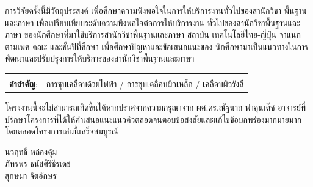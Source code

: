 \documentclass[12pt,oneside,openright,a4paper]{cpe-thai-project}
\begin{document}
การวิจัยครั้งนี้มีวัตถุประสงค์  เพื่อศึกษาความพึงพอใจในการให้บริการงานทั่วไปของสานักวิชา พื้นฐานและภาษา เพื่อเปรียบเทียบระดับความพึงพอใจต่อการให้บริการงาน ทั่วไปของสานักวิชาพื้นฐานและภาษา ของนักศึกษาที่มาใช้บริการสานักวิชาพื้นฐานและภาษา สถาบัน เทคโนโลยีไทย-ญี่ปุ่น จาแนกตามเพศ คณะ และชั้นปีที่ศึกษา เพื่อศึกษาปัญหาและข้อเสนอแนะของ นักศึกษามาเป็นแนวทางในการพัฒนาและปรับปรุงการให้บริการของสานักวิชาพื้นฐานและภาษา

\begin{flushleft}
\begin{tabular*}{\textwidth}{@{}lp{}}
 & \\

\textbf{คำสำคัญ}: & การชุบเคลือบด้วยไฟฟ้า / การชุบเคลือบผิวเหล็ก /  เคลือบผิวรังสี
\end{tabular*}
\end{flushleft}
\endabstract


\preface
โครงงานนี้จะไม่สามารถเกิดขึ้นได้หากปราศจากความกรุณาจาก ผศ.ดร.ณัฐนาถ ฟาคุนเด๊ซ อาจารย์ที่ปรึกษาโครงการที่ได้ให้คำเสนอแนะแนวคิวตลอดจนตอบข้อสงสัยและแก้ไขข้อบกพร่องมากมายมากโดยตลอดโครงการเล่มนี้เสร็จสมบูรณ์

\begin{flushright}
นวฤทธิ์ หล่องคุ้ม 
\\ภัทรพร 	ธนัชศิริธีรเดช
\\สุกษมา 	จิตอักษร
\end{flushright}
  
\tableofcontents                    
\listoftables
\listoffigures                      
\end{document}

